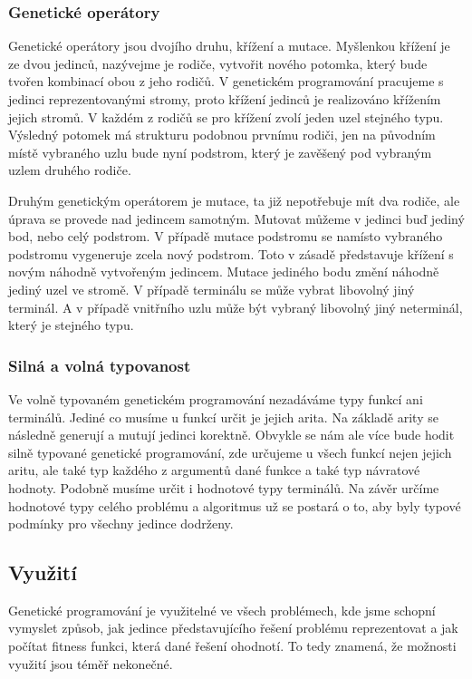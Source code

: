 \subsubsection{Genetické operátory}
Genetické operátory jsou dvojího druhu, křížení a mutace. Myšlenkou křížení je ze dvou jedinců, nazývejme je rodiče, vytvořit nového potomka, který bude tvořen kombinací obou z jeho rodičů.
V genetickém programování pracujeme s jedinci reprezentovanými stromy, proto křížení jedinců je realizováno křížením jejich stromů. V každém z rodičů se pro křížení zvolí jeden uzel stejného typu. 
Výsledný potomek má strukturu podobnou prvnímu rodiči, jen na původním místě vybraného uzlu bude nyní podstrom, který je zavěšený pod vybraným uzlem druhého rodiče.
\par
Druhým genetickým operátorem je mutace, ta již nepotřebuje mít dva rodiče, ale úprava se provede nad jedincem samotným.
Mutovat můžeme v jedinci buď jediný bod, nebo celý podstrom. V případě mutace podstromu se namísto vybraného podstromu vygeneruje zcela nový podstrom. 
Toto v zásadě představuje křížení s novým náhodně vytvořeným jedincem.
Mutace jediného bodu změní náhodně jediný uzel ve stromě. V případě terminálu se může vybrat libovolný jiný terminál. A v případě vnitřního uzlu může být vybraný libovolný jiný neterminál, který je stejného typu.


\subsubsection{Silná a volná typovanost}
Ve volně typovaném genetickém programování nezadáváme typy funkcí ani terminálů. Jediné co musíme u funkcí určit je jejich arita. Na základě arity se následně generují a mutují jedinci korektně.
Obvykle se nám ale více bude hodit silně typované genetické programování, zde určujeme u všech funkcí nejen jejich aritu, ale také typ každého z argumentů dané funkce a také typ návratové hodnoty.
Podobně musíme určit i hodnotové typy terminálů.
Na závěr určíme hodnotové typy celého problému a algoritmus už se postará o to, aby byly typové podmínky pro všechny jedince dodrženy.
\cite{typedProgramming}


\subsection{Využití}
Genetické programování je využitelné ve všech problémech, kde jsme schopní vymyslet způsob, jak jedince představujícího řešení problému reprezentovat a jak počítat fitness funkci, která dané řešení ohodnotí.
To tedy znamená, že možnosti využití jsou téměř nekonečné. 

